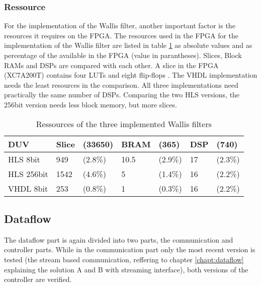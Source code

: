 \subsubsection*{Ressource} \label{ch:ver:ip:ressource}
For the implementation of the Wallis filter, another important factor is the
resources it requires on the FPGA. The resources used in the FPGA for the
implementation of the Wallis filter are listed in table \ref{tab:ressource} as
absolute values and as percentage of the available in the FPGA (value in
parantheses).
Slices, Block RAMs and DSPs are compared with each other. A slice in the FPGA 
(XC7A200T) contains four LUTs and eight flip-flops \cite{ds180}.
The VHDL implementation needs the least resources in the comparison. All
three implementations need practically the same number of DSPs. Comparing
the two HLS versions, the 256bit version needs less block memory, but more
slices.

\begin{table}[tb!]
    \centering
    \begin{tabular}{l l l l l l l}
        \toprule
        DUV         & Slice & (33650) & BRAM & (365) & DSP & (740) \\
        \midrule
        HLS  8bit    & 949 & (2.8\%)   & 10.5 & (2.9\%)  & 17 & (2.3\%) \\
        HLS  256bit  & 1542 & (4.6\%)  & 5 & (1.4\%)     & 16 & (2.2\%) \\
        VHDL 8bit       & 253 & (0.8\%)   & 1 & (0.3\%)     & 16 & (2.2\%) \\
        \bottomrule
    \end{tabular}
    \caption{Ressources of the three implemented Wallis filters}
    \label{tab:ressource}
\end{table}


%
%
\subsection{Dataflow}\label{ch:verification:dataflow}
The dataflow part is again divided into two parts, the communication and
controller parts. While in the communication part only the most recent version
is tested (the stream based communication, reffering to chapter 
\ref{chapt:dataflow} explaining the solution
A and B with streaming interface), both versions of the controller are verified.

